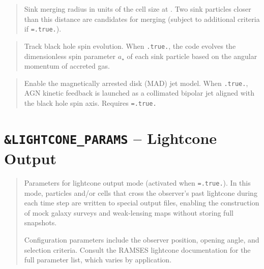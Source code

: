 \label{param:rmerge}

\begin{quote}
Sink merging radius in units of the cell size at
.  Two sink particles closer than this distance
are candidates for merging (subject to additional criteria if
\texttt{=.true.}).
\end{quote}

\label{param:spin_bh}

\begin{quote}
Track black hole spin evolution.  When \texttt{.true.}, the code
evolves the dimensionless spin parameter $a_\star$ of each sink
particle based on the angular momentum of accreted gas.
\end{quote}

\label{param:mad_jet}

\begin{quote}
Enable the magnetically arrested disk (MAD) jet model.  When
\texttt{.true.}, AGN kinetic feedback is launched as a collimated
bipolar jet aligned with the black hole spin axis.  Requires
\texttt{=.true.}
\end{quote}


\section{\texttt{\&LIGHTCONE\_PARAMS} -- Lightcone Output}
\label{sec:lightcone_params}

\begin{quote}
Parameters for lightcone output mode (activated when
\texttt{=.true.}).  In this mode, particles
and/or cells that cross the observer's past lightcone during each
time step are written to special output files, enabling the
construction of mock galaxy surveys and weak-lensing maps without
storing full snapshots.

Configuration parameters include the observer position, opening
angle, and selection criteria.  Consult the RAMSES lightcone
documentation for the full parameter list, which varies by
application.
\end{quote}


